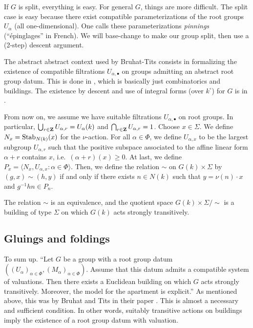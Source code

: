 If $G$ is split, everything is easy. For general $G$, things are more 
difficult. The split case is easy because there exist compatible parameterizations 
of the root groups $U_\alpha$ (all one-dimensional). One calls these 
parameterizations \emph{pinnings} (``\'epinglages'' in French). We will 
base-change to make our group split, then use a (2-step) descent argument. 

The abstract abstract context used by Bruhat-Tits consists in formalizing the 
existence of compatible filtrations $U_{\alpha,\bullet}$ on groups admitting 
an abstract root group datum. This is done in \cite{bt72}, which is basically 
just combinatorics and buildings. The existence by descent and use of integral 
forms (over $k^\circ$) for $G$ is in \cite{bt84}. 

From now on, we assume we have suitable filtrations $U_{\alpha,\bullet}$ on 
root groups. In particular, $\bigcup_{r\in \mathbf{Z}} U_{\alpha,r} = U_\alpha(k)$ 
and $\bigcap_{r\in \mathbf{Z}} U_{\alpha,r} = 1$. Choose $x\in \Sigma$. We define 
$N_x=\operatorname{Stab}_{N(k)}(x)$ for the $\nu$-action. For all 
$\alpha\in \Phi$, we define $U_{\alpha,x}$ to be the largest subgroup 
$U_{\alpha,r}$ such that the positive subspace associated to the affine linear form 
$\alpha+r$ contains $x$, i.e.\ $(\alpha+r)(x)\geqslant 0$. At last, we 
define $P_x=\langle N_x,U_{\alpha,x}:\alpha\in \Phi\rangle$. Then, we define the 
relation $\sim$ on $G(k)\times \Sigma$ by 
$(g,x)\sim(h,y)$ if and only if there exists $n\in N(k)$ such that 
$y=\nu(n)\cdot x$ and $g^{-1} h n\in P_n$. 

\begin{theo}
The relation $\sim$ is an equivalence, and the quotient space 
$G(k)\times \Sigma/\sim$ is a building of type $\Sigma$ on which $G(k)$ acts 
strongly transitively. 
\end{theo}





\subsection{Gluings and foldings}

To sum up. ``Let $G$ be a group with a root group datum 
$((U_\alpha)_{\alpha\in \Phi},(M_\alpha)_{\alpha\in \Phi})$. Assume that 
this datum admits a compatible system of valuations. Then there exists a 
Euclidean building on which $G$ acts strongly transitively. Moreover, the model 
for the apartment is explicit.'' As mentioned above, this was by Bruhat and 
Tits in their paper \cite{bt72}. This is almost a necessary and sufficient condition. 
In other words, suitably transitive actions on buildings imply the existence of 
a root group datum with valuation. 

